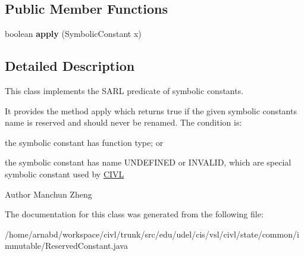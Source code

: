\subsection*{Public Member Functions}
\begin{DoxyCompactItemize}
\item 
\hypertarget{classedu_1_1udel_1_1cis_1_1vsl_1_1civl_1_1state_1_1common_1_1immutable_1_1ReservedConstant_a40ee09537d80ee6b4ee2b30cdc6a6034}{}boolean {\bfseries apply} (Symbolic\+Constant x)\label{classedu_1_1udel_1_1cis_1_1vsl_1_1civl_1_1state_1_1common_1_1immutable_1_1ReservedConstant_a40ee09537d80ee6b4ee2b30cdc6a6034}

\end{DoxyCompactItemize}


\subsection{Detailed Description}
This class implements the S\+A\+R\+L predicate of symbolic constants. 

It provides the method apply which returns true if the given symbolic constant\textquotesingle{}s name is reserved and should never be renamed. The condition is\+: 
\begin{DoxyItemize}
\item the symbolic constant has function type; or 
\item the symbolic constant has name U\+N\+D\+E\+F\+I\+N\+E\+D or I\+N\+V\+A\+L\+I\+D, which are special symbolic constant used by \hyperlink{classedu_1_1udel_1_1cis_1_1vsl_1_1civl_1_1CIVL}{C\+I\+V\+L} 
\end{DoxyItemize}

\begin{DoxyAuthor}{Author}
Manchun Zheng 
\end{DoxyAuthor}


The documentation for this class was generated from the following file\+:\begin{DoxyCompactItemize}
\item 
/home/arnabd/workspace/civl/trunk/src/edu/udel/cis/vsl/civl/state/common/immutable/Reserved\+Constant.\+java\end{DoxyCompactItemize}
